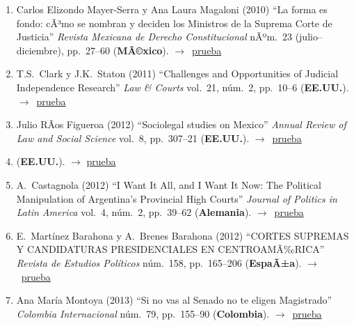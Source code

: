 \documentclass[12 pt, letter]{article}
\newenvironment{CitasMiTrabajo}{
    \begin{footnotesize}
    \begin{enumerate}[label={\footnotesize\emph{cita~\arabic*}},ref=\arabic*] %
        \setlength{\itemsep}{.1\itemsep}
        \setlength{\parskip}{.1\parskip}
    }{\end{enumerate}\end{footnotesize}}
\begin{document}
        \begin{CitasMiTrabajo}

        \item Carlos Elizondo Mayer-Serra y Ana Laura Magaloni (2010) ``La forma es fondo: cÃ³mo se nombran y deciden los Ministros de la Suprema Corte de Justicia'' \emph{Revista Mexicana de Derecho Constitucional} nÃºm.~23 (julio--diciembre), pp.~27--60 (\textbf{MÃ©xico}). $\rightarrow$~\href{http://ericmagar.com/cv/cites/sanchMagalMagarChapter/MAGALONIELIZONDO2010cc23.pdf}{prueba}

        \item T.S.~Clark y J.K.~Staton  (2011) ``Challenges and Opportunities of Judicial Independence Research'' \emph{Law \& Courts} vol.~21, n\'um.~2, pp.~10--6 (\textbf{EE.UU.}). $\rightarrow$~\href{http://ericmagar.com/cv/cites/sanchMagalMagarChapter/clark.staton2011.pdf}{prueba}

        \item Julio RÃ­os Figueroa (2012) ``Sociolegal studies on Mexico'' \emph{Annual Review of Law and Social Science} vol.~8, pp.~307--21 (\textbf{EE.UU.}). $\rightarrow$~\href{http://ericmagar.com/cv/cites/sanchMagalMagarChapter/riosSociolegalMex2012.pdf}{prueba}

        \item {} (\textbf{EE.UU.}). $\rightarrow$ \href{http://ericmagar.com/cv/cites/sanchMagalMagarChapter/carroll.tiedeVotingTribChile2012jhr.pdf}{prueba}

        \item A.~Castagnola (2012) ``I Want It All, and I Want It Now: The Political Manipulation of Argentina's Provincial High Courts'' \emph{Journal of Politics in Latin America} vol.~4, n\'um.~2, pp.~39--62 (\textbf{Alemania}). $\rightarrow$~\href{http://ericmagar.com/cv/cites/sanchMagalMagarChapter/castagnolaArgProvCourts2012jpla.pdf}{prueba}

        \item E.~Mart\'inez Barahona y A.~Brenes Barahona (2012) ``CORTES SUPREMAS Y CANDIDATURAS PRESIDENCIALES EN CENTROAMÃ‰RICA'' \emph{Revista de Estudios Pol\'iticos} n\'um.~158, pp.~165--206 (\textbf{EspaÃ±a}). $\rightarrow$~\href{http://ericmagar.com/cv/cites/sanchMagalMagarChapter/mtnzBarahonaCortesCandPres2012rep.pdf}{prueba}

        \item Ana Mar\'ia Montoya (2013) ``Si no vas al Senado no te eligen Magistrado'' \emph{Colombia Internacional} n\'um.~79, pp.~155--90 (\textbf{Colombia}). $\rightarrow$~\href{http://ericmagar.com/cv/cites/sanchMagalMagarChapter/montoya2013.pdf}{prueba}


\end{CitasMiTrabajo}
\end{document}
